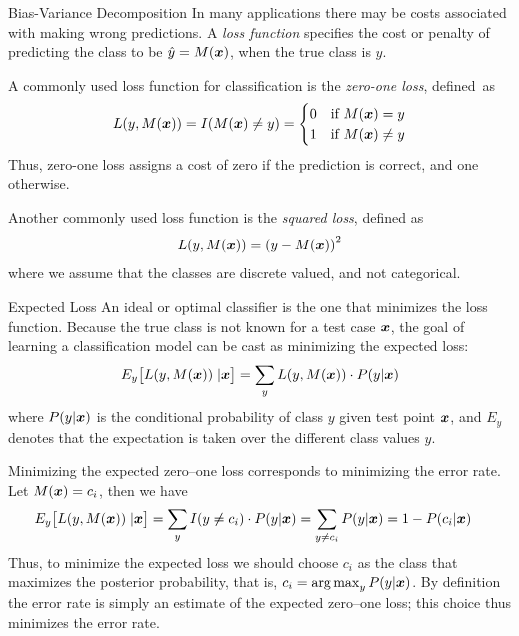 \begin{frame}{Bias-Variance Decomposition}
In many applications there may be costs associated with
making wrong predictions. A {\em loss function}
specif\/{i}es the cost or
penalty of predicting the class to be $\hat{y}=M({\boldsymbol x})$,
when the true class is $y$.

\medskip
A commonly used loss function for classif\/{i}cation is the {\em zero-one
loss}, def\/{i}ned~as
\begin{align*}
  L(y, M({\boldsymbol x})) = I(M({\boldsymbol x}) \ne y) =
  \begin{cases}
    0 & \text{if } M({\boldsymbol x})=y\\
  1 & \text{if } M({\boldsymbol x}) \ne y
 \end{cases}
\end{align*}
Thus, zero-one loss assigns a cost of zero if the prediction is correct, and one otherwise.

\medskip
Another commonly used loss function is the {\em squared loss},
def\/{i}ned
as
\begin{align*}
  L(y, M({\boldsymbol x})) = \left( y - M({\boldsymbol x}) \right)^2
\end{align*}
where we assume that the classes are discrete valued, and not
categorical.
\end{frame}



\begin{frame}{Expected Loss}
An ideal or optimal
classif\/{i}er is the one that minimizes the loss function. Because
the true class is not known for a test case ${\boldsymbol x}$, the goal of
learning a classif\/{i}cation model can be cast as minimizing the
expected loss:
\begin{align*}
  E_y\bigl[L(y, M({\boldsymbol x})) \;| {\boldsymbol x}\bigr] =
  \sum_{y} L(y, M({\boldsymbol x})) \cdot P(y|{\boldsymbol x})
\end{align*}
where $P(y|{\boldsymbol x})$ is the conditional probability of class $y$ given
test point ${\boldsymbol x}$, and $E_y$ denotes
that the expectation is taken over the different
class values $y$.

\medskip
Minimizing the expected zero--one loss corresponds to minimizing
the error rate.
Let $M({\boldsymbol x}) =
c_i$, then we have
\begin{align*}
  E_y\bigl[L(y, M({\boldsymbol x})) \;| {\boldsymbol x}\bigr] &
  = \sum_{y} I(y \ne c_i) \cdot P(y|{\boldsymbol x})
   = \sum_{y \ne c_i} P(y|{\boldsymbol x})
   = 1 - P(c_i | {\boldsymbol x})
\end{align*}
Thus, to minimize the expected loss we should choose $c_i$ as the
class that maximizes the posterior probability, that is, $c_i =
\mathop{\arg\max}_{y} P(y|{\boldsymbol x})$. By def\/{i}nition
the error rate is simply an
estimate of the expected zero--one loss; this choice thus
minimizes the error rate.
\end{frame}


